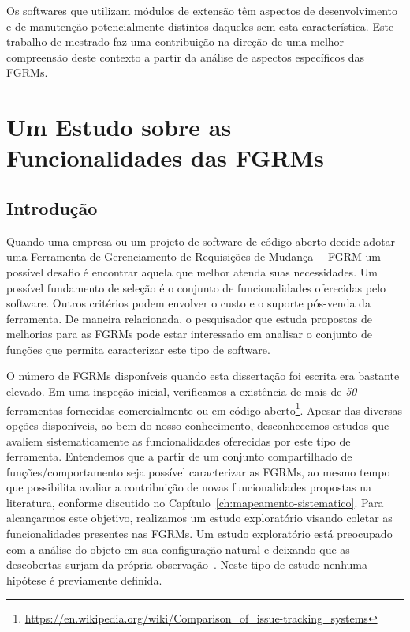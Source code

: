 Os softwares que utilizam módulos de extensão têm aspectos de desenvolvimento e
de manutenção potencialmente distintos daqueles sem esta característica. Este
trabalho de mestrado faz uma contribuição na direção de uma melhor compreensão
deste contexto a partir da análise de aspectos específicos das FGRMs.

\section{Um Estudo sobre as Funcionalidades das FGRMs}
\label{sec:caracterizacao_ferramentas}

\subsection{Introdução}
\label{subsec:caracterizacao_intro}

Quando uma empresa ou um projeto de software de código aberto decide adotar uma
Ferramenta de Gerenciamento de Requisições de Mudança~-~FGRM um possível desafio
é encontrar aquela que melhor atenda suas necessidades. Um possível fundamento
de seleção é o conjunto de funcionalidades oferecidas pelo software. Outros
critérios podem envolver o custo e o suporte pós-venda da ferramenta. De maneira
relacionada, o pesquisador que estuda propostas de melhorias para as FGRMs pode
estar interessado em analisar o conjunto de funções que permita caracterizar
este tipo de software.

O número de FGRMs disponíveis quando esta dissertação foi escrita era bastante
elevado. Em uma inspeção inicial, verificamos a existência de mais de
\textit{50} ferramentas fornecidas comercialmente ou em código
aberto\footnote{\url{https://en.wikipedia.org/wiki/Comparison_of_issue-tracking_systems}}.
Apesar das diversas opções disponíveis, ao bem do nosso conhecimento,
desconhecemos estudos que avaliem sistematicamente as funcionalidades oferecidas
por este tipo de ferramenta. Entendemos que a partir de um conjunto
compartilhado de funções/comportamento seja possível caracterizar as FGRMs, ao
mesmo tempo que possibilita avaliar a contribuição de novas funcionalidades
propostas na li\-te\-ra\-tu\-ra, conforme discutido no
Capítulo~\ref{ch:mapeamento-sistematico}. Para alcançarmos este objetivo,
realizamos um estudo exploratório visando coletar as funcionalidades presentes
nas FGRMs. Um estudo exploratório está preocupado com a análise do objeto em
sua configuração natural e deixando que as descobertas surjam da própria
observação~\cite{wohlin2012experimentation}. Neste tipo de estudo nenhuma
hipótese é previamente definida.

